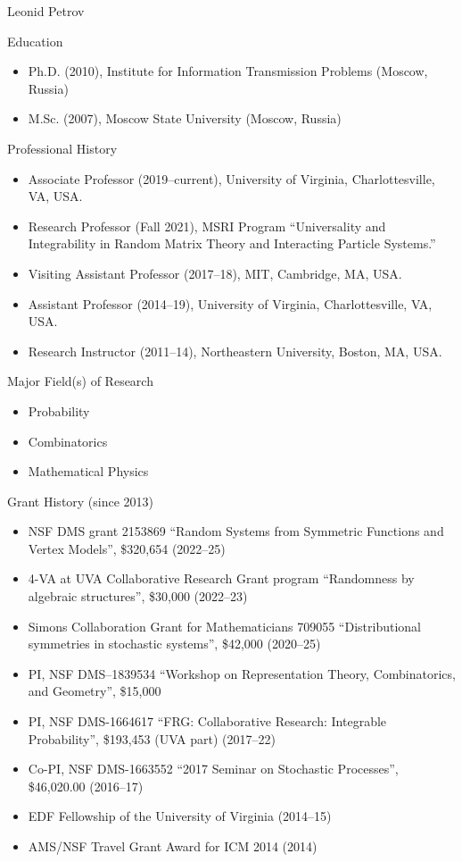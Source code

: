 \documentclass{amsart}
\begin{document}
\begin{centering}\LARGE\sc
    Leonid Petrov\\
\end{centering}
\hrulefill


\bigskip\noindent
{\sc Education}

\begin{itemize}
\item
Ph.D. (2010), Institute for Information Transmission Problems
(Moscow, Russia)
\item M.Sc. (2007), Moscow State University (Moscow, Russia)
\end{itemize}


\bigskip\noindent
{\sc Professional History}

\begin{itemize}
    \item Associate Professor (2019--current), University
of Virginia, Charlottesville, VA, USA.
    \item Research Professor (Fall 2021), MSRI Program ``Universality and Integrability in Random Matrix Theory and Interacting Particle Systems.''
\item Visiting Assistant Professor (2017--18), MIT, 
    Cambridge, MA, USA.
\item Assistant Professor (2014--19), University
of Virginia, Charlottesville, VA, USA.
\item Research Instructor (2011--14), Northeastern
University, Boston, MA, USA.
\end{itemize}

\bigskip\noindent
{\sc Major Field(s) of Research}

\begin{itemize}
\item Probability
\item Combinatorics
\item Mathematical Physics
\end{itemize}


\bigskip\noindent
{\sc Grant History (since 2013)}

\begin{itemize}
\item NSF DMS grant 2153869 
``Random Systems from Symmetric Functions and Vertex Models'',
\$320,654 (2022--25)
\item 4-VA at UVA Collaborative Research Grant program
``Randomness by algebraic structures'',
\$30,000 (2022--23)
\item Simons Collaboration Grant for Mathematicians 709055
``Distributional symmetries in stochastic systems'',
\$42,000 (2020--25)
\item PI, NSF DMS--1839534
``Workshop on Representation Theory, Combinatorics, and Geometry'',
\$15,000
\item  PI, NSF DMS-1664617
``FRG: Collaborative Research: Integrable Probability'',
\$193,453 (UVA part) (2017--22)
\item Co-PI, NSF DMS-1663552 ``2017 Seminar on Stochastic
Processes'', \$46,020.00 (2016--17)
\item EDF Fellowship of the University of Virginia (2014--15)
\item AMS/NSF Travel Grant Award for ICM 2014 (2014)
\end{itemize}
\end{document}
